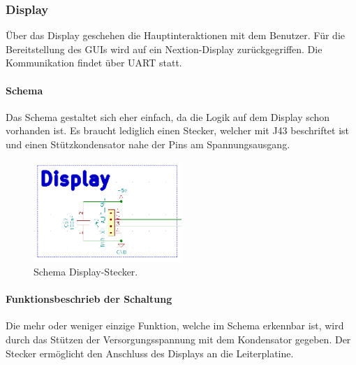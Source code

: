 \subsubsection{Display}
\label{subsubsec:Display}

Über das Display geschehen die Hauptinteraktionen mit dem Benutzer. Für die Bereitstellung des GUIs wird auf ein Nextion-Display zurückgegriffen. Die Kommunikation findet über UART statt.

\paragraph{Schema}\mbox{}

Das Schema gestaltet sich eher einfach, da die Logik auf dem Display schon vorhanden ist. Es braucht lediglich einen Stecker, welcher mit J43 beschriftet ist und einen Stützkondensator nahe der Pins am Spannungsausgang.

\begin{figure}[h!]
	\centering
	\includegraphics[width=0.5\textwidth]{graphics/Schema_Display}
	\caption{Schema Display-Stecker.}
	\label{fig:Schema_Display}
\end{figure}

\paragraph{Funktionsbeschrieb der Schaltung}\mbox{}

Die mehr oder weniger einzige Funktion, welche im Schema erkennbar ist, wird durch das Stützen der Versorgungsspannung mit dem Kondensator gegeben. Der Stecker ermöglicht den Anschluss des Displays an die Leiterplatine.